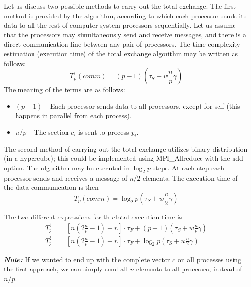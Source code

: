 Let us discuss two possible methods to carry out the total exchange. The first method is provided by the algorithm, according to which each processor sends its data to all the rest of computer system processors sequentially. Let us assume that the processors may simultaneously send and receive messages, and there is a direct communication line between any pair of processors. The time complexity estimation (execution time) of the total exchange algorithm may be written as follows:
\begin{equation}
  T_p^1(comm) = (p-1) \left( \tau_S + w \frac{n}{p} \gamma \right)
\end{equation}
The meaning of the terms are as follows:
\begin{itemize}\itemsep=0em
  \item $(p-1)$ -- Each processor sends data to all processors, except for self (this happens in parallel from each process).
  \item $n/p$ -- The section $c_i$ is sent to process $p_i$.
\end{itemize}

The second method of carrying out the total exchange utilizes binary distribution (in a hypercube); this could be implemented using MPI\_Allreduce with the add option. The algorithm may be executed in $\log_2 p$ steps. At each step each processor sends and receives a message of $n/2$ elements. The execution time of the data communication is then
\begin{equation}
  T_p(comm) = \log_2 p \left( \tau_S + w \frac{n}{2} \gamma \right)
\end{equation}

The two different expressions for th etotal execution time is
\begin{align}
    T_p^1 &= \left[ n \left( 2 \frac{n}{p} -1 \right) + n \right] \cdot \tau_F
           + (p-1) \left( \tau_S + w \frac{n}{p} \gamma \right)\\
    T_p^2 &= \left[ n \left( 2 \frac{n}{p} -1 \right) + n \right] \cdot \tau_F
           + \log_2 p \left( \tau_S + w \frac{n}{2} \gamma \right)
\end{align}

\emph{\textbf{Note:}} If we wanted to end up with the complete vector $c$ on all processes using the first approach, we can simply send all $n$ elements to all processes, instead of $n/p$.

